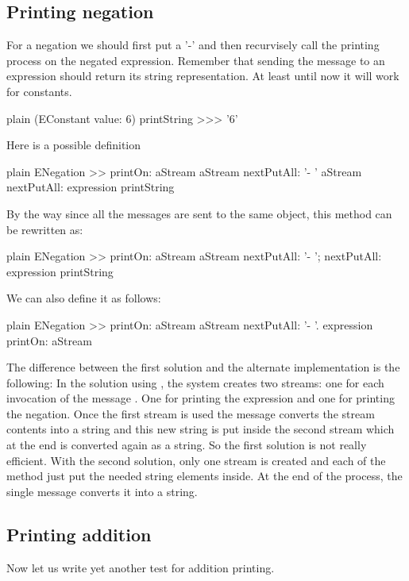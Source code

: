 \documentclass[10pt,twoside,english]{_support/latex/sbabook/sbabook}
\begin{document}
\subsection{Printing negation}
For a negation we should first put a '-' and then recurvisely call the printing process on the negated expression. Remember that sending the message  to an expression should return its string representation.  At least until now it will work for constants. 

\begin{displaycode}{plain}
(EConstant value: 6) printString
>>> '6'
\end{displaycode}

Here is a possible definition

\begin{displaycode}{plain}
ENegation >> printOn: aStream
	aStream nextPutAll: '- '
	aStream nextPutAll: expression printString
\end{displaycode}

By the way since all the messages are sent to the same object, this method can be rewritten as:

\begin{displaycode}{plain}
ENegation >> printOn: aStream
	aStream 
		nextPutAll: '- ';
		nextPutAll: expression printString
\end{displaycode}

We can also define it as follows: 

\begin{displaycode}{plain}
ENegation >> printOn: aStream
	aStream nextPutAll: '- '.
	expression printOn: aStream
\end{displaycode}

The difference between the first solution and the alternate implementation is the following:
In the solution using , the system creates two streams: one for each invocation of the message . One for printing the expression and one for printing the negation. Once the first stream is used the message  converts the stream contents into a string and this new string is put inside the second stream which at the end is converted again as a string. So the first solution is not really efficient. 
With the second solution, only one stream is created and each of the method just put the needed string elements inside. 
At the end of the process, the single  message converts it into a string. 
\subsection{Printing addition}
Now let us write yet another test for addition printing. 
\end{document}
